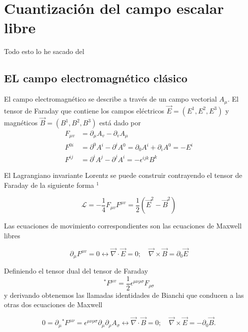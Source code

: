 \setchapterpreamble[u]{\margintoc}
\chapter{Cuantización del campo escalar libre}

\begin{center}
  \large Todo esto lo he sacado del \cite{Maroto}
\end{center}
\section{EL campo electromagnético clásico}

El campo electromagnético se describe a través de un campo vectorial $A_{\mu}$. El tensor de Faraday que contiene los campos eléctricos $\vec{E}=\left(E^{1}, E^{2}, E^{3}\right)$ y magnéticos $\vec{B}=\left(B^{1}, B^{2}, B^{3}\right)$ está dado por
$$
\begin{align*}
F_{\mu v} & =\partial_{\mu} A_{v}-\partial_{v} A_{\mu}  \tag{6.1}\\
F^{0 i} & =\partial^{0} A^{i}-\partial^{i} A^{0}=\partial_{0} A^{i}+\partial_{i} A^{0}=-E^{i}  \tag{6.2}\\
F^{i j} & =\partial^{i} A^{j}-\partial^{j} A^{i}=-\epsilon^{i j k} B^{k} \tag{6.3}
\end{align*}
$$

El Lagrangiano invariante Lorentz se puede construir contrayendo el tensor de Faraday de la siguiente forma ${ }^{1}$

\begin{equation*}
\mathscr{L}=-\frac{1}{4} F_{\mu v} F^{\mu v}=\frac{1}{2}\left(\vec{E}^{2}-\vec{B}^{2}\right) \tag{6.4}
\end{equation*}


Las ecuaciones de movimiento correspondientes son las ecuaciones de Maxwell libres

\begin{equation*}
\partial_{\mu} F^{\mu v}=0 \leftrightarrow \vec{\nabla} \cdot \vec{E}=0 ; \quad \vec{\nabla} \times \vec{B}=\partial_{0} \vec{E} \tag{6.5}
\end{equation*}


Definiendo el tensor dual del tensor de Faraday
$$
{ }^{*} F^{\mu v}=\frac{1}{2} \epsilon^{\mu \nu \rho \sigma} F_{\rho \sigma}
$$
y derivando obtenemos las llamadas identidades de Bianchi que conducen a las otras dos ecuaciones de Maxwell

\begin{equation*}
0=\partial_{\mu}{ }^{*} F^{\mu \nu}=\epsilon^{\mu \nu \rho \sigma} \partial_{\mu} \partial_{\rho} A_{\sigma} \leftrightarrow \vec{\nabla} \cdot \vec{B}=0 ; \quad \vec{\nabla} \times \vec{E}=-\partial_{0} \vec{B} . \tag{6.6}
\end{equation*}

